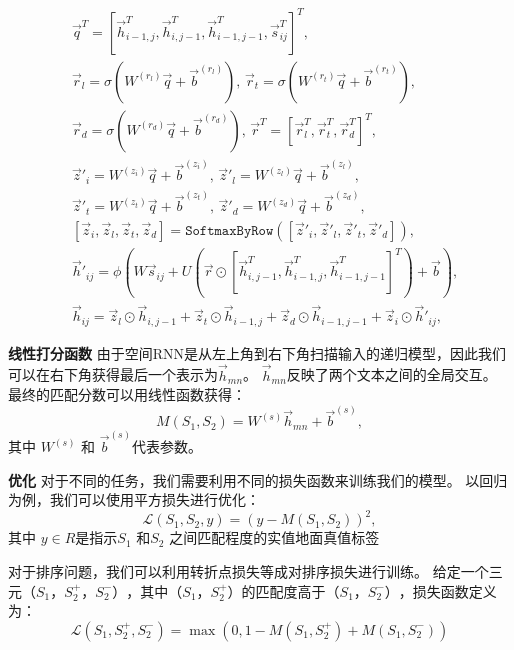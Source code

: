 \begin{align}\label{eq:SRNN}
&\vec{q}^T=[\vec{h}_{i-1,j}^T,\vec{h}_{i,j-1}^T,\vec{h}_{i-1,j-1}^T,\vec{s}_{ij}^T]^T,\nonumber\\
		&\vec{r}_l =\sigma(W^{(r_l)}\vec{q}+\vec{b}^{(r_l)}),\,\vec{r}_t =\sigma(W^{(r_t)}\vec{q}+\vec{b}^{(r_t)}),\nonumber\\
		&\vec{r}_d =\sigma(W^{(r_d)}\vec{q}+\vec{b}^{(r_d)}),\,\vec{r}^T  =[\vec{r}_l^T,\vec{r}_t^T,\vec{r}_d^T]^T,\nonumber\\
		&\vec{z}'_{i} = W^{(z_i)}\vec{q}+\vec{b}^{(z_i)},\,\vec{z}'_{l} =W^{(z_l)}\vec{q}+\vec{b}^{(z_l)},\nonumber\\
 		&\vec{z}'_{t} =W^{(z_t)}\vec{q}+\vec{b}^{(z_t)},\,\vec{z}'_{d}=W^{(z_d)}\vec{q}+\vec{b}^{(z_d)},\nonumber\\
 		&[\vec{z}_i, \vec{z}_l, \vec{z}_t, \vec{z}_{d}] = \texttt{SoftmaxByRow}([\vec{z}'_i, \vec{z}'_l, \vec{z}'_t, \vec{z}'_{d}]),\\
 		&\vec{h}'_{ij} {=}\phi(W\vec{s}_{ij} + U(\vec{r}\odot[\vec{h}_{i,j-1}^T, \vec{h}_{i-1,j}^T, \vec{h}_{i-1,j-1}^T]^T) + \vec{b}), \nonumber\\
 		&\vec{h}_{ij}     {=}\vec{z}_{l}\odot\vec{h}_{i,j-1}{+}\vec{z}_{t}\odot\vec{h}_{i-1,j}{+}
            		  \vec{z}_{d}\odot\vec{h}_{i-1,j-1}{+}\vec{z}_{i}\odot\vec{h}'_{ij},
	\end{align}

\textbf{线性打分函数}
由于空间RNN是从左上角到右下角扫描输入的递归模型，因此我们可以在右下角获得最后一个表示为$ \vec {h} _ {mn} $。 $ \vec {h} _ {mn} $反映了两个文本之间的全局交互。 最终的匹配分数可以用线性函数获得：
\begin{equation}
M(S_1,S_2)=W^{(s)}\vec{h}_{mn}+\vec{b}^{(s)},
\end{equation}
其中 $W^{(s)}$ 和 $\vec{b}^{(s)}$代表参数。

\textbf{优化}
对于不同的任务，我们需要利用不同的损失函数来训练我们的模型。
以回归为例，我们可以使用平方损失进行优化：
\begin{equation}
\mathcal{L}(S_1,S_2,y)= (y-M(S_1,S_2))^2,
\end{equation}
其中 $y\in R$是指示$S_1$ 和$S_2$ 之间匹配程度的实值地面真值标签

对于排序问题，我们可以利用转折点损失等成对排序损失进行训练。 给定一个三元$（S_1，S_2 ^ +，S_2 ^ - ）$，其中$（S_1，S_2 ^ +）$的匹配度高于$（S_1，S_2 ^ - ）$，损失函数定义为：
\begin{equation*}
\mathcal{L}(S_1, S_2^+, S_2^-) = \max(0, 1-M(S_1, S_2^+)+M(S_1, S_2^-))
\end{equation*}

